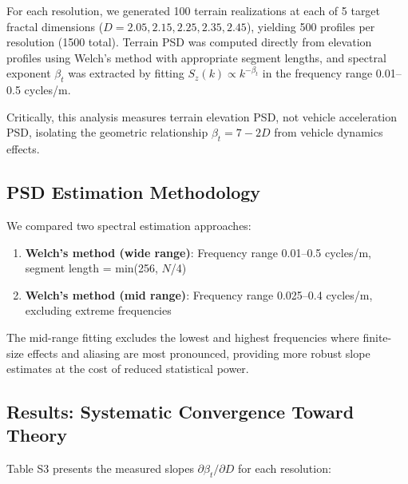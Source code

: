 \documentclass[11pt,letterpaper]{article}
\begin{document}
For each resolution, we generated 100 terrain realizations at each of 5 target fractal dimensions ($D = 2.05, 2.15, 2.25, 2.35, 2.45$), yielding 500 profiles per resolution (1500 total). Terrain PSD was computed directly from elevation profiles using Welch's method with appropriate segment lengths, and spectral exponent $\beta_t$ was extracted by fitting $S_z(k) \propto k^{-\beta_t}$ in the frequency range 0.01--0.5 cycles/m.

Critically, this analysis measures terrain elevation PSD, not vehicle acceleration PSD, isolating the geometric relationship $\beta_t = 7-2D$ from vehicle dynamics effects.

\subsection{PSD Estimation Methodology}

We compared two spectral estimation approaches:
\begin{enumerate}
\item \textbf{Welch's method (wide range)}: Frequency range 0.01--0.5 cycles/m, segment length = min(256, $N$/4)
\item \textbf{Welch's method (mid range)}: Frequency range 0.025--0.4 cycles/m, excluding extreme frequencies
\end{enumerate}

The mid-range fitting excludes the lowest and highest frequencies where finite-size effects and aliasing are most pronounced, providing more robust slope estimates at the cost of reduced statistical power.

\subsection{Results: Systematic Convergence Toward Theory}

Table S3 presents the measured slopes $\partial \beta_t / \partial D$ for each resolution:
\end{document}
